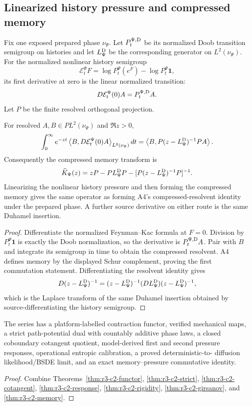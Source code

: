 \subsection{Linearized history pressure and compressed memory}

Fix one exposed prepared phase \(\nu_\Psi\).  Let
\(P_t^{\Psi,\rm D}\) be its normalized Doob transition semigroup on histories
and let \(L_\Psi^{\rm D}\) be the corresponding generator on
\(L^2(\nu_\Psi)\).  For the normalized nonlinear history semigroup
\[
 \mathcal E_t^\Psi F
 =\log P_t^\Psi(e^F)-\log P_t^\Psi\mathbf1,
\]
its first derivative at zero is the linear normalized transition:
\[
 D\mathcal E_t^\Psi(0)A=P_t^{\Psi,\rm D}A.
\]
Let \(P\) be the finite resolved orthogonal projection.

\begin{theorem}
\label{thm:r3-c2-memory}
For resolved \(A,B\in PL^2(\nu_\Psi)\) and \(\Re z>0\),
\[
 \int_0^\infty e^{-zt}
 \left\langle B,D\mathcal E_t^\Psi(0)A\right\rangle_{L^2(\nu_\Psi)}dt
 =\left\langle
 B,P(z-L_\Psi^{\rm D})^{-1}PA
 \right\rangle.
\]
Consequently the compressed memory transform is
\[
 \widehat K_\Psi(z)
 =zP-PL_\Psi^{\rm D}P-
 [P(z-L_\Psi^{\rm D})^{-1}P]^{-1}.
\]
Linearizing the nonlinear history pressure and then forming the compressed
memory gives the same operator as forming A4's compressed-resolvent identity
under the prepared phase.  A further source derivative on either route is the
same Duhamel insertion.
\end{theorem}

\begin{proof}
Differentiate the normalized Feynman--Kac formula at \(F=0\).  Division by
\(P_t^\Psi\mathbf1\) is exactly the Doob normalization, so the derivative is
\(P_t^{\Psi,\rm D}A\).  Pair with \(B\) and integrate its semigroup in time to
obtain the compressed resolvent.  A4 defines memory by the displayed Schur
complement, proving the first commutation statement.  Differentiating the
resolvent identity gives
\[
 D(z-L_\Psi^{\rm D})^{-1}
 =(z-L_\Psi^{\rm D})^{-1}
 (DL_\Psi^{\rm D})
 (z-L_\Psi^{\rm D})^{-1},
\]
which is the Laplace transform of the same Duhamel insertion obtained by
source-differentiating the history semigroup.
\end{proof}

\begin{theorem}
\label{thm:r3-c2-main}
The series has a platform-labelled contraction functor, verified mechanical
maps, a strict path-potential dual with countably additive phase laws, a closed
coboundary cotangent quotient, model-derived first and second pressure
responses, operational entropic calibration, a proved deterministic-to-
diffusion likelihood/BSDE limit, and an exact memory--pressure commutative
identity.
\end{theorem}

\begin{proof}
Combine Theorems~\ref{thm:r3-c2-functor},
\ref{thm:r3-c2-strict}, \ref{thm:r3-c2-cotangent},
\ref{thm:r3-c2-response}, \ref{thm:r3-c2-rigidity},
\ref{thm:r3-c2-girsanov}, and \ref{thm:r3-c2-memory}.
\end{proof}
